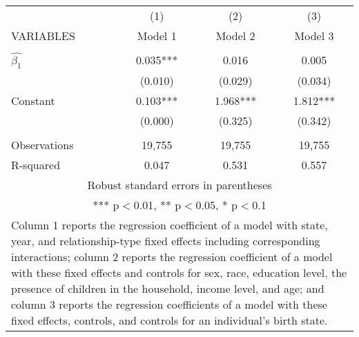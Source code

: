 \begin{tabular}{lccc}
\hline
 & (1) & (2) & (3) \\
VARIABLES & Model 1 & Model 2 & Model 3 \\ \hline
 &  &  &  \\
$\hat{\beta_1}$ & 0.035*** & 0.016 & 0.005 \\
 & (0.010) & (0.029) & (0.034) \\
Constant & 0.103*** & 1.968*** & 1.812*** \\
 & (0.000) & (0.325) & (0.342) \\
 &  &  &  \\
Observations & 19,755 & 19,755 & 19,755 \\
 R-squared & 0.047 & 0.531 & 0.557 \\ \hline
\multicolumn{4}{c}{ Robust standard errors in parentheses} \\
\multicolumn{4}{c}{ *** p$<$0.01, ** p$<$0.05, * p$<$0.1} \\
\multicolumn{4}{p{0.6\linewidth}}{\footnotesize Column 1 reports the regression coefficient of a model with state, year, and relationship-type fixed effects including corresponding interactions; column 2 reports the regression coefficient of a model with these fixed effects and controls for sex, race, education level, the presence of children in the household, income level, and age; and column 3 reports the regression coefficients of a model with these fixed effects, controls, and controls for an individual’s birth state.} \\
\end{tabular}
